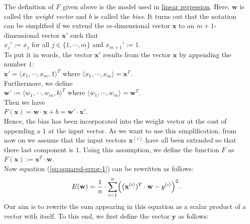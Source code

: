 The definition of $F$ given above is the model used in
\href{https://en.wikipedia.org/wiki/Linear_regression}{linear regression}. 
Here, $\mathbf{w}$ is called the \emph{weight vector} and $b$ is called the \emph{bias}.  It turns
out that the notation can be simplified if we extend the $m$-dimensional vector $\mathbf{x}$ to an
$m+1$-dimensional vector $\mathbf{x}'$ such that
\\[0.2cm]
\hspace*{1.3cm}
$x_j' := x_j$ \quad for all $j\in\{1,\cdots,m\}$ \quad and \quad $x_{m+1}' := 1$.
\\[0.2cm]
To put it in words, the vector $\mathbf{x}'$ results from the vector $\mathbf{x}$ by appending the number $1$:
\\[0.2cm]
\hspace*{1.3cm}
$\mathbf{x}' = \langle x_1, \cdots, x_m, 1 \rangle^T$ \quad where $\langle x_1, \cdots, x_m \rangle = \mathbf{x}^T$.
\\[0.2cm]
Furthermore, we define 
\\[0.2cm]
\hspace*{1.3cm}
$\mathbf{w}' := \langle w_1, \cdots, w_m, b \rangle^T$ \quad where $\langle w_1, \cdots, w_m \rangle = \mathbf{w}^T$.
\\[0.2cm]
Then we have
\\[0.2cm]
\hspace*{1.3cm}
$F(\mathbf{x}) = \mathbf{w} \cdot \mathbf{x} + b = \mathbf{w}' \cdot \mathbf{x}'$.
\\[0.2cm]
Hence, the bias has been incorporated into the weight vector at the cost of appending a $1$ at the
input vector.  As we want to use this simplification, from now on we assume that the input vectors
$\mathbf{x}^{(i)}$ have all been extended so that there last component is $1$.  Using this
assumption,  we define the
function $F$ as
\\[0.2cm]
\hspace*{1.3cm}
$F(\mathbf{x}) := \mathbf{x}^T \cdot \mathbf{w}$.
\\[0.2cm]
Now equation (\ref{eq:squared-error-1}) can be rewritten as follows:
\begin{equation}
  \label{eq:squared-error-2}
  E(\mathbf{w}) = \frac{1}{n} \cdot \sum\limits_{i=1}^n \Bigl(\bigl(\mathbf{x}^{(i)})^T \cdot \mathbf{w}  - y^{(i)}\Bigr)^2.
\end{equation}
Our aim is to rewrite the sum appearing in this equation as a scalar product of a vector with
itself.  To this end, we first define the vector $\mathbf{y}$ as follows:
\\[0.2cm]
